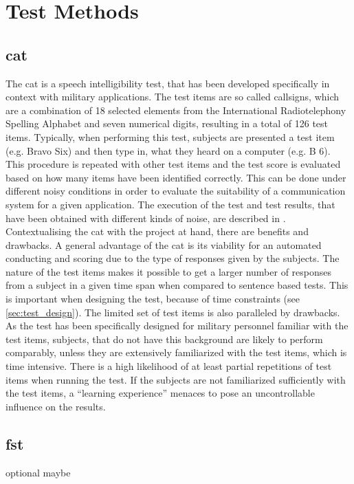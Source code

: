\section{Test Methods}\label{sec:methods}

\subsection{\gls{cat}}\label{ssec:cat}
The \gls{cat} is a speech intelligibility test, that has been developed specifically in context with military applications. The test items are so called callsigns, which are a combination of 18 selected elements from the International Radiotelephony Spelling Alphabet and seven numerical digits, resulting in a total of 126 test items.
Typically, when performing this test, subjects are presented a test item (e.g. Bravo Six) and then type in, what they heard on a computer (e.g. B 6). This procedure is repeated with other test items and the test score is evaluated based on how many items have been identified correctly.
This can be done under different noisy conditions in order to evaluate the suitability of a communication system for a given application.
The execution of the test and test results, that have been obtained with different kinds of noise, are described in \citep{rao_2006}.
Contextualising the \gls{cat} with the project at hand, there are benefits and drawbacks. A general advantage of the \gls{cat} is its viability for an automated conducting and scoring due to the type of responses given by the subjects. The nature of the test items makes it possible to get a larger number of responses from a subject in a given time span when compared to sentence based tests.
This is important when designing the test, because of time constraints (see \autoref{sec:test_design}).
The limited set of test items is also paralleled by drawbacks. As the test has been specifically designed for military personnel familiar with the test items, subjects, that do not have this background are likely to perform comparably, unless they are extensively familiarized with the test items, which is time intensive. There is a high likelihood of at least partial repetitions of test items when running the test. If the subjects are not familiarized sufficiently with the test items, a \enquote{learning experience} menaces to pose an uncontrollable influence on the results.

\subsection{\gls{fst}}\label{ssec:fst}
optional maybe
